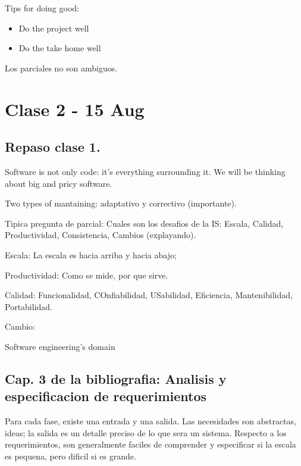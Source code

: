 \documentclass[a4paper, 12pt]{article}
\begin{document}
Tips for doing good:

\begin{itemize}
    \item Do the project well 
    \item Do the take home well
\end{itemize}

Los parciales no son ambiguos.

\section{Clase 2 - 15 Aug}

\subsection{Repaso clase 1.}

Software is not only code: it's everything surrounding it. We will be thinking
about big and pricy software.

Two types of mantaining: adaptativo y correctivo (importante).

Tipica pregunta de parcial: Cuales son los desafios de la IS: Escala, Calidad,
Productividad, Consistencia, Cambios (explayando).

Escala: La escala es hacia arriba y hacia abajo; 

Productividad: Como se mide, por que sirve. 

Calidad: Funcionalidad, COnfiabilidad, USabilidad, Eficiencia, Mantenibilidad, Portabilidad. 

Cambio:

Software engineering's domain

\subsection{Cap. 3 de la bibliografia: Analisis y especificacion de requerimientos}

Para cada fase, existe una entrada y una salida. Las necesidades son abstractas, ideas; la salida es 
un detalle preciso de lo que sera un sistema. Respecto a los requerimientos, son generalmente 
faciles de comprender y especificar si la escala es pequena, pero dificil si es grande.
\end{document}

